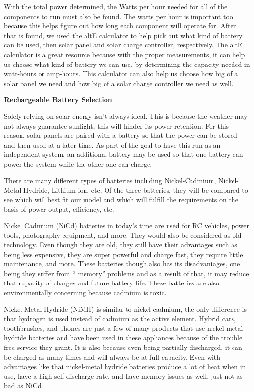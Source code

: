 With the total power determined, the Watts per hour needed for all of the components to run must also be found. The watts per hour is important too because this helps figure out how long each component will operate for. After that is found, we used the altE calculator to help pick out what kind of battery can be used, then solar panel and solar charge controller, respectively. The altE calculator is a great resource because with the proper measurements, it can help us choose what kind of battery we can use, by determining the capacity needed in watt-hours or amp-hours. This calculator can also help us choose how big of a solar panel we need and how big of a solar charge controller we need as well. \par
\textbf{Rechargeable Battery Selection}\par
Solely relying on solar energy isn’t always ideal. This is because the weather may not always guarantee sunlight, this will hinder its power retention. For this reason, solar panels are paired with a battery so that the power can be stored and then used at a later time. As part of the goal to have this run as an independent system, an additional battery may be used so that one battery can power the system while the other one can charge.\par
There are many different types of batteries including Nickel-Cadmium, Nickel-Metal Hydride, Lithium ion, etc. Of the three batteries, they will be compared to see which will best fit our model and which will fulfill the requirements on the basis of power output, efficiency, etc.\par
Nickel Cadmium (NiCd) batteries in today’s time are used for RC vehicles, power tools, photography equipment, and more. They would also be considered as old technology. Even though they are old, they still have their advantages such as being less expensive, they are super powerful and charge fast, they require little maintenance, and more. These batteries though also has its disadvantages, one being they suffer from “ memory” problems and as a result of that, it may reduce that capacity of charges and future battery life. These batteries are also environmentally concerning because cadmium is toxic. \par
Nickel-Metal Hydride (NiMH) is similar to nickel cadmium, the only difference is that hydrogen is used instead of cadmium as the active element. Hybrid cars, toothbrushes, and phones are just a few of many products that use nickel-metal hydride batteries and have been used in these appliances because of the trouble free service they grant. It is also because even being partially discharged, it can be charged as many times and will always be at full capacity. Even with advantages like that nickel-metal hydride batteries produce a lot of heat when in use, have a high self-discharge rate, and have memory issues as well, just not as bad as NiCd.\par
